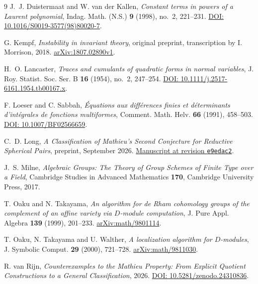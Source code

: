\documentclass[11pt]{article}
\begin{document}
\begin{thebibliography}{9}
J.~J. Duistermaat and W. van der Kallen,
\emph{Constant terms in powers of a Laurent polynomial},
Indag. Math. (N.S.) \textbf{9} (1998), no.~2, 221--231.
\href{https://doi.org/10.1016/S0019-3577(98)80020-7}{DOI: 10.1016/S0019-3577(98)80020-7}.

G. Kempf, \emph{Instability in invariant theory}, original preprint,
transcription by I. Morrison, 2018.
\href{https://arxiv.org/abs/1807.02890v1}{arXiv:1807.02890v1}.

H.~O. Lancaster, \emph{Traces and cumulants of quadratic forms in normal
variables}, J. Roy. Statist. Soc. Ser. B \textbf{16} (1954), no.~2,
247--254.
\href{https://doi.org/10.1111/j.2517-6161.1954.tb00167.x}{DOI: 10.1111/j.2517-6161.1954.tb00167.x}.

F. Loeser and C. Sabbah,
\emph{\'Equations aux diff\'erences finies et d\'eterminants d'int\'egrales
de fonctions multiformes}, Comment. Math. Helv. \textbf{66} (1991), 458--503.
\href{https://doi.org/10.1007/BF02566659}{DOI: 10.1007/BF02566659}.

C.~D. Long,
\emph{A Classification of Mathieu's Second Conjecture for Reductive
Spherical Pairs}, preprint, September 2026.
\href{https://github.com/long-mathematics/mathieu-second-conjecture-spherical-pairs/blob/e9edac262b4b64eb68feb0e6e80496cefe4a1dee/mathieu_second_conjecture_spherical_pairs.tex}{Manuscript at revision \texttt{e9edac2}}.

J.~S. Milne,
\emph{Algebraic Groups: The Theory of Group Schemes of Finite Type over a
Field}, Cambridge Studies in Advanced Mathematics \textbf{170},
Cambridge University Press, 2017.

T. Oaku and N. Takayama,
\emph{An algorithm for de Rham cohomology groups of the complement of an
affine variety via \(D\)-module computation}, J. Pure Appl. Algebra
\textbf{139} (1999), 201--233.
\href{https://arxiv.org/abs/math/9801114}{arXiv:math/9801114}.

T. Oaku, N. Takayama and U. Walther,
\emph{A localization algorithm for \(D\)-modules}, J. Symbolic Comput.
\textbf{29} (2000), 721--728.
\href{https://arxiv.org/abs/math/9811030}{arXiv:math/9811030}.

R. van Rijn,
\emph{Counterexamples to the Mathieu Property: From Explicit Quotient
Constructions to a General Classification}, 2026.
\href{https://doi.org/10.5281/zenodo.24310836}{DOI: 10.5281/zenodo.24310836}.
\end{thebibliography}
\end{document}
